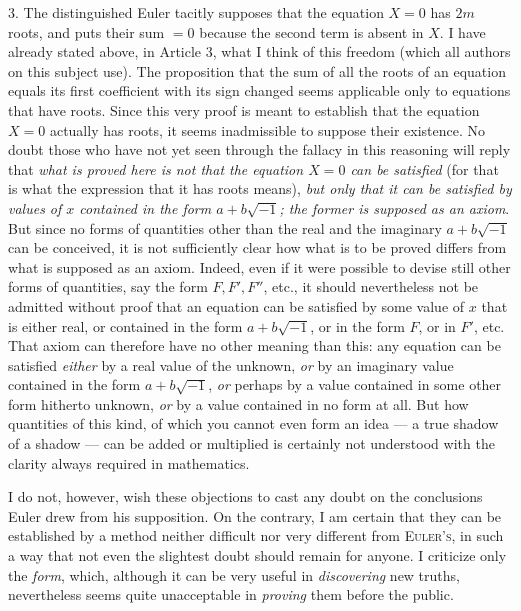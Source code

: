 3. The distinguished Euler tacitly supposes that the equation \mbox{$X=0$} has $2m$ roots, and puts their sum $=0$ because the second term is absent in $X$. I have already stated above, in Article 3, what I think of this freedom (which all authors on this subject use). The proposition that the sum of all the roots of an equation equals its first coefficient with its sign changed seems applicable only to equations that have roots. Since this very proof is meant to establish that the equation \mbox{$X=0$} actually has roots, it seems inadmissible to suppose their existence. No doubt those who have not yet seen through the fallacy in this reasoning will reply that \textit{what is proved here is not that the equation \mbox{$X=0$} can be satisfied} (for that is what the expression that it has roots means), \textit{but only that it can be satisfied by values of $x$ contained in the form $a+b\sqrt{-1}$; the former is supposed as an axiom}. But since no forms of quantities other than the real and the imaginary $a+b\sqrt{-1}$ can be conceived, it is not sufficiently clear how what is to be proved differs from what is supposed as an axiom. Indeed, even if it were possible to devise still other forms of quantities, say the form $F,F',F''$, etc., it should nevertheless not be admitted without proof that an equation can be satisfied by some value of $x$ that is either real, or contained in the form $a+b\sqrt{-1}$, or in the form $F$, or in $F'$, etc. That axiom can therefore have no other meaning than this: any equation can be satisfied \textit{either} by a real value of the unknown, \textit{or} by an imaginary value contained in the form $a+b\sqrt{-1}$, \textit{or} perhaps by a value contained in some other form hitherto unknown, \textit{or} by a value contained in no form at all. But how quantities of this kind, of which you cannot even form an idea --- a true shadow of a shadow --- can be added or multiplied is certainly not understood with the clarity always required in mathematics.

I do not, however, wish these objections to cast any doubt on the conclusions Euler drew from his supposition. On the contrary, I am certain that they can be established by a method neither difficult nor very different from \textsc{Euler's}, in such a way that not even the slightest doubt should remain for anyone. I criticize only the \textit{form}, which, although it can be very useful in \textit{discovering} new truths, nevertheless seems quite unacceptable in \textit{proving} them before the public.

